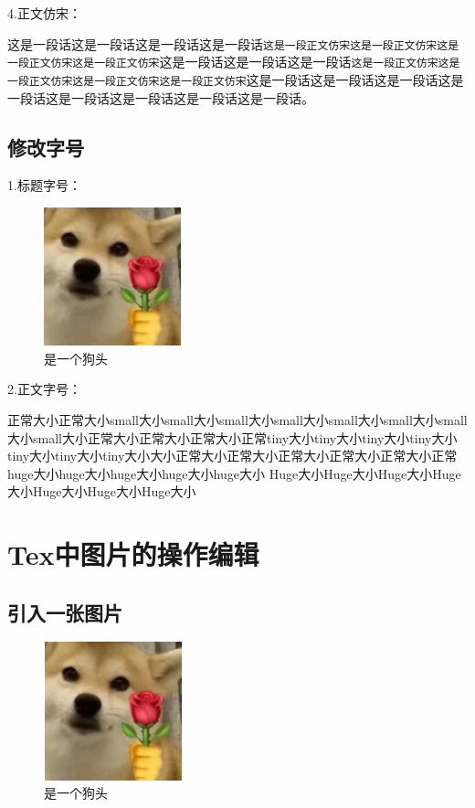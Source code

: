 \documentclass[normalsize]{article}   %
\begin{document}
		\noindent 4.正文仿宋：
		
		这是一段话这是一段话这是一段话这是一段话\texttt{这是一段正文仿宋这是一段正文仿宋这是一段正文仿宋这是一段正文仿宋}这是一段话这是一段话这是一段话\texttt{这是一段正文仿宋这是一段正文仿宋这是一段正文仿宋这是一段正文仿宋}这是一段话这是一段话这是一段话这是一段话这是一段话这是一段话这是一段话这是一段话。
		
		\subsection{修改字号}
		
		\noindent 1.标题字号：
			
					\begin{figure}[htbp!]
						\centering
						\includegraphics[height=4cm]{./img/sample.png}
						\caption{是一个狗头}
						\label{fig:10}
			    	\end{figure}
		    	
		\noindent 2.正文字号：
		
		正常大小正常大小\small{small大小small大小small大小small大小small大小small大小small大小small大小}正常大小正常大小正常大小正常\tiny{tiny大小tiny大小tiny大小tiny大小tiny大小tiny大小tiny大小}大小正常大小正常大小正常大小正常大小正常大小正常\huge{huge大小huge大小huge大小huge大小huge大小} \Huge{Huge大小Huge大小Huge大小Huge大小Huge大小Huge大小Huge大小}\\
		
		\normalsize
		\newpage
	\section{Tex中图片的操作编辑}
		\subsection{引入一张图片}
		\begin{figure}
			\centering
			\includegraphics[height=4cm,width=4cm]{./img/sample.png}%
			\caption{是一个狗头}
			\label{fig:10}
		\end{figure}
		\newpage
\end{document}
